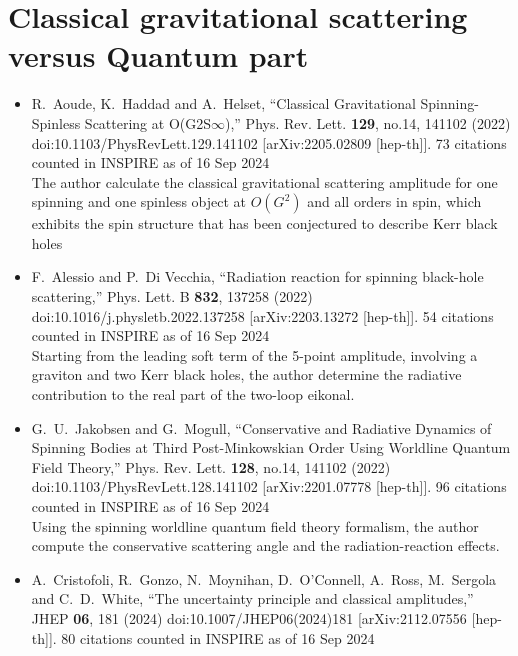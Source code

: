 \documentclass[a4paper,12pt]{article}
\begin{document}
\section*{Classical gravitational scattering versus Quantum part}
\begin{itemize}
    \item %
    R.~Aoude, K.~Haddad and A.~Helset,
    ``Classical Gravitational Spinning-Spinless Scattering at O(G2S\ensuremath{\infty}),''
    Phys. Rev. Lett. \textbf{129}, no.14, 141102 (2022)\\
    doi:10.1103/PhysRevLett.129.141102
    [arXiv:2205.02809 [hep-th]].
    73 citations counted in INSPIRE as of 16 Sep 2024\\
    The author calculate
    the classical gravitational scattering amplitude for one spinning and one spinless object at $O(G^2)$
    and all orders in spin, which exhibits the spin structure that has been
    conjectured to describe Kerr black holes
    \item %
    F.~Alessio and P.~Di Vecchia,
    ``Radiation reaction for spinning black-hole scattering,''
    Phys. Lett. B \textbf{832}, 137258 (2022)
    doi:10.1016/j.physletb.2022.137258
    [arXiv:2203.13272 [hep-th]].
    54 citations counted in INSPIRE as of 16 Sep 2024\\
    Starting from the leading soft term of the 5-point amplitude, involving a graviton and two Kerr black holes, the author determine the
    radiative contribution to the real part of the two-loop eikonal.
    \item %
    G.~U.~Jakobsen and G.~Mogull,
    ``Conservative and Radiative Dynamics of Spinning Bodies at Third Post-Minkowskian Order Using Worldline Quantum Field Theory,''
    Phys. Rev. Lett. \textbf{128}, no.14, 141102 (2022)
    doi:10.1103/PhysRevLett.128.141102
    [arXiv:2201.07778 [hep-th]].
    96 citations counted in INSPIRE as of 16 Sep 2024\\
    Using the spinning worldline quantum field theory formalism, the author compute the conservative scattering angle and the radiation-reaction effects.
    \item %
    A.~Cristofoli, R.~Gonzo, N.~Moynihan, D.~O'Connell, A.~Ross, M.~Sergola and C.~D.~White,
    ``The uncertainty principle and classical amplitudes,''
    JHEP \textbf{06}, 181 (2024)
    doi:10.1007/JHEP06(2024)181
    [arXiv:2112.07556 [hep-th]].
    80 citations counted in INSPIRE as of 16 Sep 2024\\

\end{itemize}
\end{document}
